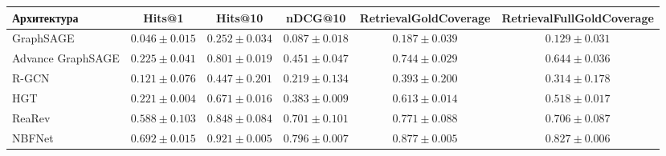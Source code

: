 \begin{tabular}{lccccc}
\toprule
Архитектура & Hits@1 & Hits@10 & nDCG@10 & RetrievalGoldCoverage & RetrievalFullGoldCoverage \\
\midrule
GraphSAGE & $0.046 \pm 0.015$ & $0.252 \pm 0.034$ & $0.087 \pm 0.018$ & $0.187 \pm 0.039$ & $0.129 \pm 0.031$ \\
Advance GraphSAGE & $0.225 \pm 0.041$ & $0.801 \pm 0.019$ & $0.451 \pm 0.047$ & $0.744 \pm 0.029$ & $0.644 \pm 0.036$ \\
R-GCN & $0.121 \pm 0.076$ & $0.447 \pm 0.201$ & $0.219 \pm 0.134$ & $0.393 \pm 0.200$ & $0.314 \pm 0.178$ \\
HGT & $0.221 \pm 0.004$ & $0.671 \pm 0.016$ & $0.383 \pm 0.009$ & $0.613 \pm 0.014$ & $0.518 \pm 0.017$ \\
ReaRev & $0.588 \pm 0.103$ & $0.848 \pm 0.084$ & $0.701 \pm 0.101$ & $0.771 \pm 0.088$ & $0.706 \pm 0.087$ \\
NBFNet & {\boldmath $0.692 \pm 0.015$} & {\boldmath $0.921 \pm 0.005$} & {\boldmath $0.796 \pm 0.007$} & {\boldmath $0.877 \pm 0.005$} & {\boldmath $0.827 \pm 0.006$} \\
\bottomrule
\end{tabular}
